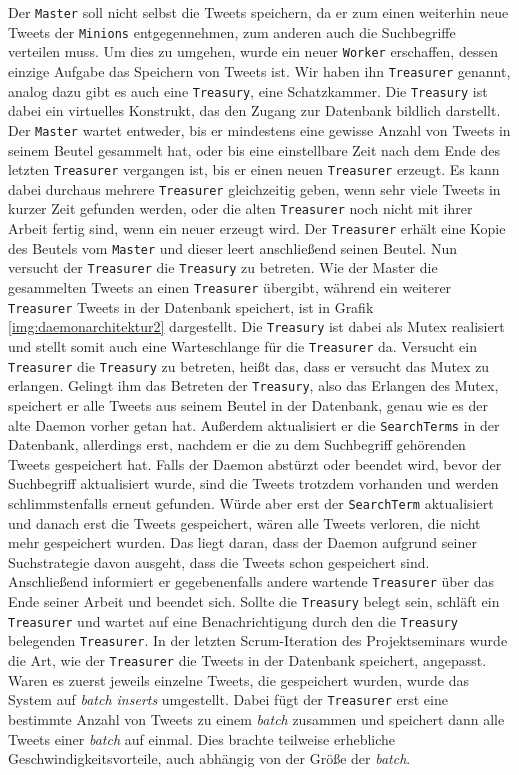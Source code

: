 Der \texttt{Master} soll nicht selbst die Tweets speichern, da er zum einen weiterhin neue Tweets der \texttt{Minions} entgegennehmen, zum anderen auch die Suchbegriffe verteilen muss.
Um dies zu umgehen, wurde ein neuer \texttt{Worker} erschaffen, dessen einzige Aufgabe das Speichern von Tweets ist.
Wir haben ihn \texttt{Treasurer} genannt, analog dazu gibt es auch eine \texttt{Treasury}, eine Schatzkammer.
Die \texttt{Treasury} ist dabei ein virtuelles Konstrukt, das den Zugang zur Datenbank bildlich darstellt.
Der \texttt{Master} wartet entweder, bis er mindestens eine gewisse Anzahl von Tweets in seinem Beutel gesammelt hat, oder bis eine einstellbare Zeit nach dem Ende des letzten \texttt{Treasurer} vergangen ist, bis er einen neuen \texttt{Treasurer} erzeugt.
Es kann dabei durchaus mehrere \texttt{Treasurer} gleichzeitig geben, wenn sehr viele Tweets in kurzer Zeit gefunden werden, oder die alten \texttt{Treasurer} noch nicht mit ihrer Arbeit fertig sind, wenn ein neuer erzeugt wird.
Der \texttt{Treasurer} erhält eine Kopie des Beutels vom \texttt{Master} und dieser leert anschließend seinen Beutel.
Nun versucht der \texttt{Treasurer} die \texttt{Treasury} zu betreten.
Wie der Master die gesammelten Tweets an einen \texttt{Treasurer} übergibt, während ein weiterer \texttt{Treasurer} Tweets in der Datenbank speichert, ist in Grafik \ref{img:daemonarchitektur2} dargestellt.
Die \texttt{Treasury} ist dabei als Mutex realisiert und stellt somit auch eine Warteschlange für die \texttt{Treasurer} da.
Versucht ein \texttt{Treasurer} die \texttt{Treasury} zu betreten, heißt das, dass er versucht das Mutex zu erlangen.
Gelingt ihm das Betreten der \texttt{Treasury}, also das Erlangen des Mutex, speichert er alle Tweets aus seinem Beutel in der Datenbank, genau wie es der alte Daemon vorher getan hat.
Außerdem aktualisiert er die \texttt{SearchTerms} in der Datenbank, allerdings erst, nachdem er die zu dem Suchbegriff gehörenden Tweets gespeichert hat.
Falls der Daemon abstürzt oder beendet wird, bevor der Suchbegriff aktualisiert wurde, sind die Tweets trotzdem vorhanden und werden schlimmstenfalls erneut gefunden.
Würde aber erst der \texttt{SearchTerm} aktualisiert und danach erst die Tweets gespeichert, wären alle Tweets verloren, die nicht mehr gespeichert wurden.
Das liegt daran, dass der Daemon aufgrund seiner Suchstrategie davon ausgeht, dass die Tweets schon gespeichert sind.
Anschließend informiert er gegebenenfalls andere wartende \texttt{Treasurer} über das Ende seiner Arbeit und beendet sich.
Sollte die \texttt{Treasury} belegt sein, schläft ein \texttt{Treasurer} und wartet auf eine Benachrichtigung durch den die \texttt{Treasury} belegenden \texttt{Treasurer}.
In der letzten Scrum-Iteration des Projektseminars wurde die Art, wie der \texttt{Treasurer} die Tweets in der Datenbank speichert, angepasst.
Waren es zuerst jeweils einzelne Tweets, die gespeichert wurden, wurde das System auf \textit{batch inserts} umgestellt.
Dabei fügt der \texttt{Treasurer} erst eine bestimmte Anzahl von Tweets zu einem \textit{batch} zusammen und speichert dann alle Tweets einer \textit{batch} auf einmal.
Dies brachte teilweise erhebliche Geschwindigkeitsvorteile, auch abhängig von der Größe der \textit{batch}.

